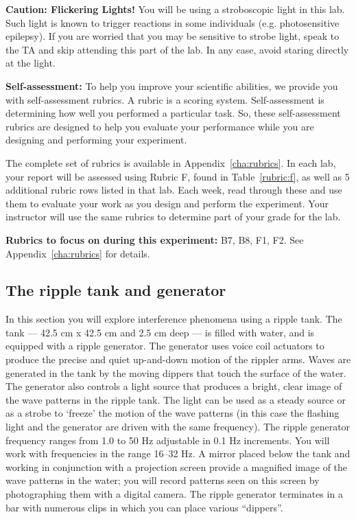 \begin{framed}
	\textbf{Caution: Flickering Lights!} You will be using a stroboscopic light in this lab. Such light is known to trigger reactions in some individuals (e.g. photosensitive epilepsy).
	If you are worried that you may be sensitive to strobe light, speak to the TA and skip attending this part of the lab.
	In any case, avoid staring directly at the light.
\end{framed}

\begin{framed}
	\textbf{Self-assessment:} To help you improve your scientific abilities, we provide you with self-assessment rubrics.
	A rubric is a scoring system.
	Self-assessment is determining how well you performed a particular task.
	So, these self-assessment rubrics are designed to help you evaluate your performance while you are designing and performing your experiment.
	
	The complete set of rubrics is available in Appendix~\ref{cha:rubrics}.
	In each lab, your report will be assessed using Rubric F, found in Table~\ref{rubric:f}, as well as 5 additional rubric rows listed in that lab.
	Each week, read through these and use them to evaluate your work as you design and perform the experiment.
	Your instructor will use the same rubrics to determine part of your grade for the lab.
\end{framed}	

\textbf{Rubrics to focus on during this experiment:} B7, B8, F1, F2. See Appendix~\ref{cha:rubrics} for details.

\subsection{The ripple tank and generator}

In this section you will explore interference phenomena using a ripple tank. The tank --- 42.5 cm x 42.5 cm and 2.5
cm deep --- is filled with water, and is equipped with a ripple generator. The generator uses voice coil actuators to
produce the precise and quiet up-and-down motion of the rippler arms. Waves are generated in the tank by the moving
dippers that touch the surface of the water. The generator also controls a light source that produces a bright, clear
image of the wave patterns in the ripple tank. The light can be used as a steady source or as a strobe to ‘freeze’ the
motion of the wave patterns (in this case the flashing light and the generator are driven with the same frequency). The
ripple generator frequency ranges from 1.0 to 50 Hz adjustable in 0.1 Hz increments. You will work with frequencies in
the range 16--32 Hz. A mirror placed below the tank and working in conjunction with a projection screen provide a
magnified image of the wave patterns in the water; you will record patterns seen on this screen by photographing them
with a digital camera. The ripple generator terminates in a bar with numerous clips in which you can place various
``dippers''.

